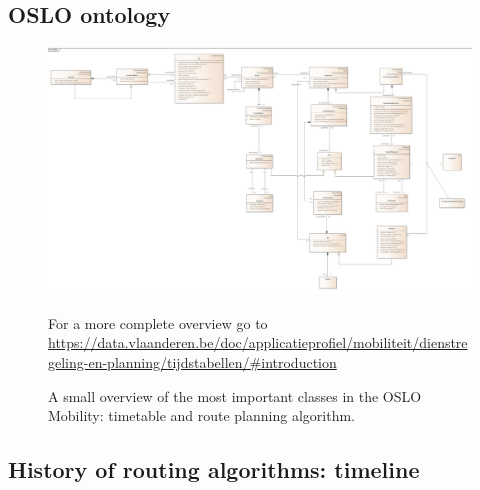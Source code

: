 \begin{appendices}

\newpage

\begin{landscape}
\section*{OSLO ontology}
    \begin{figure}[H]
    \centering
    \includegraphics[width=1.4\textwidth]{images/overview.jpg}
    \caption{A small overview of the most important classes in the OSLO Mobility: timetable and route planning algorithm. }
    \tiny For a more complete overview go to \url{https://data.vlaanderen.be/doc/applicatieprofiel/mobiliteit/dienstregeling-en-planning/tijdstabellen/#introduction}
    \label{fig:appendix:Ontology:oslo:overview}
\end{figure}
\end{landscape}

\begin{landscape}
    \section*{History of routing algorithms: timeline}
    
\end{landscape}

\end{appendices}
